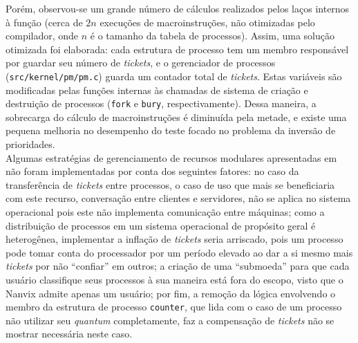 \documentclass[12pt]{article}
\begin{document}
Porém, observou-se um grande número de cálculos realizados pelos laços internos
à função (cerca de $2n$ execuções de macroinstruções, não otimizadas pelo
compilador, onde $n$ é o tamanho da tabela de processos). Assim, uma solução
otimizada foi elaborada: cada estrutura de processo tem um membro responsável
por guardar seu número de \emph{tickets}, e o gerenciador de processos
(\texttt{src/kernel/pm/pm.c}) guarda um contador total de \emph{tickets}. Estas
variáveis são modificadas pelas funções internas às chamadas de sistema de
criação e destruição de processos (\texttt{fork} e \texttt{bury},
respectivamente). Dessa maneira, a sobrecarga do cálculo de macroinstruções é
diminuída pela metade, e existe uma pequena melhoria no desempenho do teste
focado no problema da inversão de prioridades. \\

Algumas estratégias de gerenciamento de recursos modulares apresentadas em
~\cite[cap. 3]{Waldspurger:1994:LSF:1267638.1267639} não foram implementadas por
conta dos seguintes fatores: no caso da transferência de \emph{tickets} entre
processos, o caso de uso que mais se beneficiaria com este recurso, conversação
entre clientes e servidores, não se aplica no sistema operacional pois este não
implementa comunicação entre máquinas; como a distribuição de processos em um
sistema operacional de propósito geral é heterogênea, implementar a inflação de
\emph{tickets} seria arriscado, pois um processo pode tomar conta do
processador por um período elevado ao dar a si mesmo mais \emph{tickets} por
não ``confiar'' em outros; a criação de uma ``submoeda'' para que cada usuário
classifique seus processos à sua maneira está fora do escopo, visto que o
Nanvix admite apenas um usuário; por fim, a remoção da lógica envolvendo o
membro da estrutura de processo \texttt{counter}, que lida com o caso de um
processo não utilizar seu \emph{quantum} completamente, faz a compensação de
\emph{tickets} não se mostrar necessária neste caso.



\end{document}
